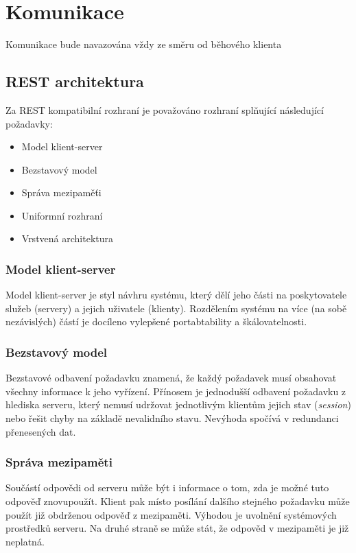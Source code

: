 \section{Komunikace}

Komunikace bude navazována vždy ze směru od běhového klienta

\subsection{REST architektura}

Za REST kompatibilní rozhraní je považováno rozhraní splňující následující požadavky:

\begin{itemize}
	\item Model klient-server
	\item Bezstavový model
	\item Správa mezipaměťi
	\item Uniformní rozhraní
	\item Vrstvená architektura
\end{itemize}

\subsubsection{Model klient-server}

Model klient-server je styl návhru systému, který dělí jeho části na poskytovatele služeb (servery) a jejich uživatele (klienty).
Rozdělením systému na více (na sobě nezávislých) částí je docíleno vylepšené portabtability a škálovatelnosti.

\subsubsection{Bezstavový model}

Bezstavové odbavení požadavku znamená, že každý požadavek musí obsahovat všechny informace k jeho vyřízení.
Přínosem je jednodušší odbavení požadavku z hlediska serveru, který nemusí udržovat jednotlivým klientům jejich stav (\textit{session}) nebo řešit chyby na základě nevalidního stavu.
Nevýhoda spočívá v redundanci přenesených dat.

\subsubsection{Správa mezipaměti}

Součástí odpovědi od serveru může být i informace o tom, zda je možné tuto odpověď znovupoužít.
Klient pak místo posílání dalšího stejného požadavku může použít již obdrženou odpověď z mezipaměti.
Výhodou je uvolnění systémových prostředků serveru.
Na druhé straně se může stát, že odpověd v mezipaměti je již neplatná.

